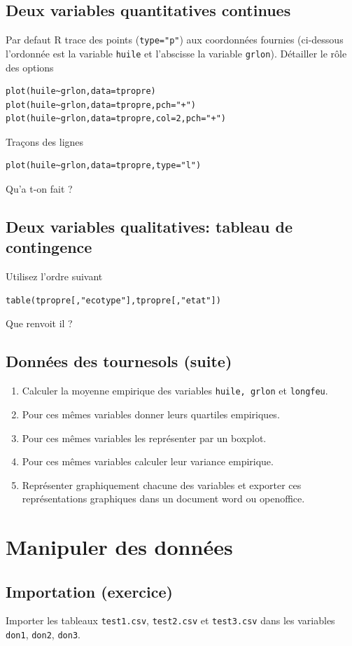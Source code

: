 \documentclass[a4paper,10pt,french]{article}
\newcommand{\code}[1]{\texttt{#1}}
\begin{document}
\subsection{Deux variables quantitatives continues}
Par defaut \textsf{R} trace des points (\texttt{type="p"}) aux
coordonnées fournies (ci-dessous l'ordonnée est la variable
\texttt{huile} et l'abscisse la variable \texttt{grlon}). Détailler le
rôle des options
\begin{verbatim}
plot(huile~grlon,data=tpropre)
plot(huile~grlon,data=tpropre,pch="+")
plot(huile~grlon,data=tpropre,col=2,pch="+")
\end{verbatim}

Traçons des lignes
\begin{verbatim}
plot(huile~grlon,data=tpropre,type="l")
\end{verbatim}
Qu'a t-on fait ?

\subsection{Deux variables qualitatives: tableau de contingence}
Utilisez l'ordre suivant
\begin{verbatim}
table(tpropre[,"ecotype"],tpropre[,"etat"])
\end{verbatim}
Que renvoit il ?

\subsection{Données des tournesols (suite)}
\begin{enumerate}
\item Calculer la moyenne empirique des variables \texttt{huile, grlon} et \texttt{longfeu}.
\item Pour ces mêmes variables donner leurs quartiles empiriques.
\item Pour ces mêmes variables les représenter par un boxplot.
\item Pour ces mêmes variables calculer leur variance empirique.
\item Représenter graphiquement chacune des variables et exporter ces
  représentations graphiques dans un document word ou openoffice.
\end{enumerate}
\section{Manipuler des données}
\subsection{Importation (exercice)}
Importer les tableaux \code{test1.csv},
\code{test2.csv} et \code{test3.csv} dans les variables \code{don1}, \code{don2}, \code{don3}.
\end{document}
